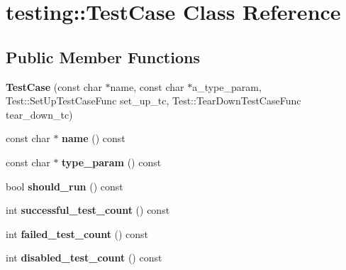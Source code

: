\hypertarget{classtesting_1_1_test_case}{}\section{testing\+:\+:Test\+Case Class Reference}
\label{classtesting_1_1_test_case}
\subsection*{Public Member Functions}
\begin{DoxyCompactItemize}
\item 
\mbox{\label{classtesting_1_1_test_case_a8a43b04703bfc7d56597fcb9b76ffbf5}} 
{\bfseries Test\+Case} (const char $\ast$name, const char $\ast$a\+\_\+type\+\_\+param, Test\+::\+Set\+Up\+Test\+Case\+Func set\+\_\+up\+\_\+tc, Test\+::\+Tear\+Down\+Test\+Case\+Func tear\+\_\+down\+\_\+tc)
\item 
\mbox{\label{classtesting_1_1_test_case_a3f1beb98d5f7e3b037a4ec82b64cc1cf}} 
const char $\ast$ {\bfseries name} () const
\item 
\mbox{\label{classtesting_1_1_test_case_a9df62c4104a4f856b477c9e8335bb689}} 
const char $\ast$ {\bfseries type\+\_\+param} () const
\item 
\mbox{\label{classtesting_1_1_test_case_a843d6cd43f3e587bfa8681990b9d59df}} 
bool {\bfseries should\+\_\+run} () const
\item 
\mbox{\label{classtesting_1_1_test_case_ab61929942a202f03903182866bd0e086}} 
int {\bfseries successful\+\_\+test\+\_\+count} () const
\item 
\mbox{\label{classtesting_1_1_test_case_a70e26eb070c75ae62a191fa610ea234f}} 
int {\bfseries failed\+\_\+test\+\_\+count} () const
\item 
\mbox{\label{classtesting_1_1_test_case_a8ef690ab8ec74d02c99416637de71ae8}} 
int {\bfseries disabled\+\_\+test\+\_\+count} () const
\item 
\mbox{\label{classtesting_1_1_test_case_a57f115315eb756e23be6651bb5e6c638}} 

\end{DoxyCompactItemize}
